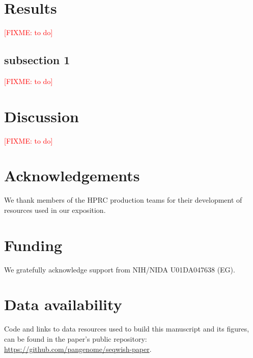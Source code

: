 \documentclass{bioinfo}
\newcommand{\red}[1]{{\textcolor{Red}{#1}}}
\newcommand{\FIXME}[1]{\red{[FIXME: #1]}}
\begin{document}
    \section{Results}
    \label{sec:results}
    \FIXME{to do}

    \subsection{subsection 1}
    \label{subsec:subsec1}
    \FIXME{to do}


    \section{Discussion}
    \label{sec:discussion}
    \FIXME{to do}

    \section*{Acknowledgements}

    We thank members of the HPRC production teams for their development of resources used in our exposition.

    \section*{Funding}

    We gratefully acknowledge support from NIH/NIDA U01DA047638 (EG).

    \section*{Data availability}

    Code and links to data resources used to build this manuscript and its figures, can be found in the paper's public repository: \url{https://github.com/pangenome/seqwish-paper}.

    

    
\end{document}
